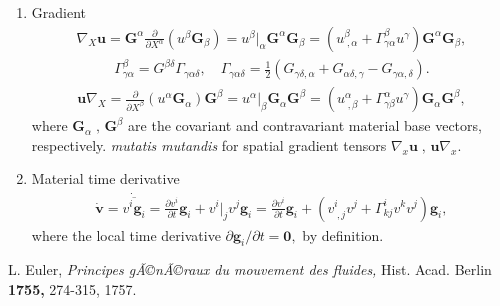 \documentclass[12pt]{article}
\begin{document}
\begin{itemize}
{\begin{enumerate}
derivative and contravariant and covariant spatial base vectors, respectively.
\item Gradient
\begin{align*}
\nabla_X\mathbf{u}=\mathbf{G}^\alpha\frac{\partial}{\partial{X}^\alpha}
(u^\beta\mathbf{G}_\beta)=u^\beta\vert_\alpha\mathbf{G}^\alpha\mathbf{G}_\beta=
(u^\beta_{\;,\alpha}+
\Gamma^\beta_{\gamma\alpha}u^\gamma)\mathbf{G}^\alpha\mathbf{G}_\beta,
\end{align*}
\begin{align*}
\Gamma^\beta_{\gamma\alpha}=G^{\beta\delta}\Gamma_{\gamma\alpha\delta},
\quad \Gamma_{\gamma\alpha\delta}=\frac{1}{2}(G_{\gamma\delta,\alpha}+
G_{\alpha\delta,\gamma}-G_{\gamma\alpha,\delta}).
\end{align*}
\begin{align*}
\mathbf{u}\nabla_X=\frac{\partial}{\partial{X}^\beta}(u^\alpha\mathbf{G}_\alpha)
\mathbf{G}^\beta=u^\alpha\vert_\beta\mathbf{G}_\alpha\mathbf{G}^\beta=
(u^\alpha_{\;,\beta}+\Gamma^\alpha_{\gamma\beta}u^\gamma)\mathbf{G}_\alpha
\mathbf{G}^\beta,
\end{align*}
where $\mathbf{G}_\alpha\;,\,\mathbf{G}^\beta$ are the covariant and contravariant 
material base vectors, respectively. {\em mutatis mutandis} for spatial gradient
tensors $\nabla_x\mathbf{u}\;,\,\mathbf{u}\nabla_x.$
\item Material time derivative
\begin{align*}
\dot{\mathbf{v}}=\dot{\overline{v^i\mathbf{g}_i}}=
\frac{\partial{v^i}}{\partial{t}}\mathbf{g}_i+v^i\vert_jv^j\mathbf{g}_i=
\frac{\partial{v^i}}{\partial{t}}\mathbf{g}_i+(v^i_{\;,j}v^j+
\Gamma^i_{kj}v^kv^j)\mathbf{g}_i,
\end{align*}
where the local time derivative  $\partial\mathbf{g}_i/\partial{t}=\mathbf{0},$ by definition.
\end{enumerate}}
\end{itemize}
\begin{thebibliography}{1}
L. Euler, {\em Principes gÃ©nÃ©raux du mouvement des fluides,} Hist. Acad. Berlin {\bf 1755,} 274-315, 1757.
\end{thebibliography}

\end{document}
